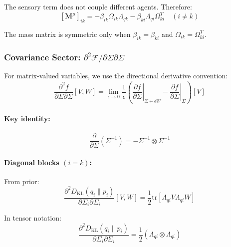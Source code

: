 \documentclass[12pt]{article}
\begin{document}
The sensory term does not couple different agents. Therefore:
\begin{equation}
\boxed{
[\mathbf{M}^\mu]_{ik} = -\beta_{ik}\Omega_{ik}\Lambda_{qk} - \beta_{ki}\Lambda_{qi}\Omega_{ki}^T \quad (i \neq k)
}
\label{eq:mass_offdiagonal}
\end{equation}


The mass matrix is symmetric only when $\beta_{ik} = \beta_{ki}$ and $\Omega_{ik} = \Omega_{ki}^T$.


\subsubsection{Covariance Sector: $\partial^2\mathcal{F}/\partial\Sigma\partial\Sigma$}

For matrix-valued variables, we use the directional derivative convention:
\begin{equation}
\frac{\partial^2 f}{\partial \Sigma \partial \Sigma}[V, W] = \lim_{\epsilon \to 0} \frac{1}{\epsilon}\left(\left.\frac{\partial f}{\partial \Sigma}\right|_{\Sigma + \epsilon W} - \left.\frac{\partial f}{\partial \Sigma}\right|_{\Sigma}\right)[V]
\end{equation}

\paragraph{Key identity:}
\begin{equation}
\frac{\partial}{\partial \Sigma}(\Sigma^{-1}) = -\Sigma^{-1} \otimes \Sigma^{-1}
\end{equation}

\paragraph{Diagonal blocks $(i = k)$:}

From prior:
\begin{equation}
\frac{\partial^2 D_{\mathrm{KL}}(q_i \| p_i)}{\partial \Sigma_i \partial \Sigma_i}[V, W] = \frac{1}{2}\mathrm{tr}\left[\Lambda_{qi}V\Lambda_{qi}W\right]
\end{equation}

In tensor notation:
\begin{equation}
\frac{\partial^2 D_{\mathrm{KL}}(q_i \| p_i)}{\partial \Sigma_i \partial \Sigma_i} = \frac{1}{2}(\Lambda_{qi} \otimes \Lambda_{qi})
\end{equation}
\end{document}
